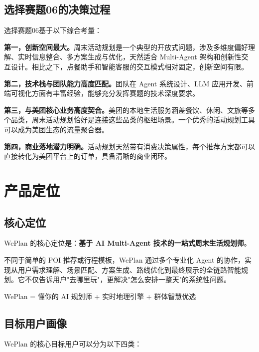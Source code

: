 \documentclass[12pt,a4paper]{ctexart}
\begin{document}
\subsection{选择赛题06的决策过程}

选择赛题06基于以下综合考量：

\textbf{第一，创新空间最大。}周末活动规划是一个典型的开放式问题，涉及多维度偏好理解、实时信息整合、多方案生成与优化，天然适合 Multi-Agent 架构和创新性交互设计。相比之下，点餐助手和智能客服的交互模式相对固定，创新空间有限。

\textbf{第二，技术栈与团队能力高度匹配。}团队在 Agent 系统设计、LLM 应用开发、前端可视化方面有丰富经验，能够充分发挥赛题的技术深度要求。

\textbf{第三，与美团核心业务高度契合。}美团的本地生活服务涵盖餐饮、休闲、文旅等多个品类，周末活动规划恰好是连接这些品类的枢纽场景。一个优秀的活动规划工具可以成为美团生态的流量聚合器。

\textbf{第四，商业落地潜力明确。}活动规划天然带有消费决策属性，每个推荐方案都可以直接转化为美团平台上的订单，具备清晰的商业闭环。

\newpage

\section{产品定位}

\subsection{核心定位}

WePlan 的核心定位是：\textbf{基于 AI Multi-Agent 技术的一站式周末生活规划师}。

不同于简单的 POI 推荐或行程模板，WePlan 通过多个专业化 Agent 的协作，实现从用户需求理解、场景匹配、方案生成、路线优化到最终展示的全链路智能规划。它不仅告诉用户"去哪里玩"，更解决"怎么安排一整天"的系统性问题。

\begin{successbox}
WePlan = 懂你的 AI 规划师 + 实时地理引擎 + 群体智慧优选
\end{successbox}

\subsection{目标用户画像}

WePlan 的核心目标用户可以分为以下四类：
\end{document}
